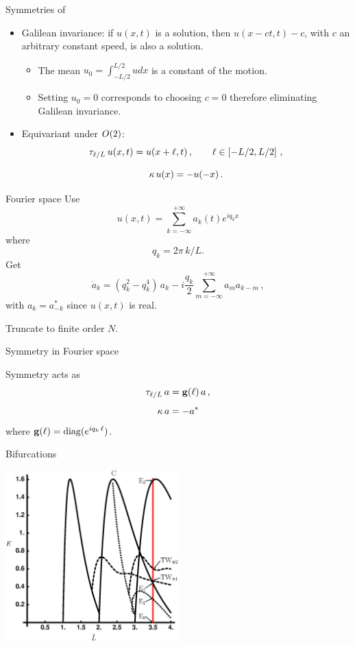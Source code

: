 \documentclass{beamer}
\begin{document}
\begin{frame}{Symmetries of \KSe}

\begin{itemize}
 \item Galilean invariance: if $u(x,t)$ is a solution, then $u(x-ct,t)-c$, with $c$ an arbitrary constant
	speed, is also a solution.
	\begin{itemize}
		\item The mean $u_0=\int_{-L/2}^{L/2} u dx$ is a constant of the motion. \\
		\item Setting $u_0=0$ corresponds to choosing $c=0$ therefore eliminating Galilean invariance.
	\end{itemize}
 \item Equivariant under $O(2)$:
\[
	\tau_{\ell/L}\, u(x,t) = u(x+\ell,t)\,,\qquad \ell\in\left[-L/2,L/2\right]\,,
\]

\[
    \kappa \, u(x) = -u(-x)
\,.
\]
\end{itemize}
\end{frame}

\begin{frame}{Fourier space}
Use
\[
  u(x,t)=\sum_{k=-\infty}^{+\infty} a_k (t) e^{ i q_k x }
\]
where
\[
 q_k = 2\pi\,k/L.
\]
Get
\[
 \dot{a}_k
     = ( q_k^2 - q_k^4 )\, a_k
    - i \frac{q_k}{2} \sum_{m=-\infty}^{+\infty} a_m a_{k-m}\,,
\]
with $a_{k}=a^\ast_{-k}$ since $u(x,t)$ is real.

Truncate to finite order $N$.
\end{frame}

\begin{frame}{Symmetry in Fourier space}

Symmetry acts as
\[
  \tau_{\ell/L}\, a = \mathbf{g}(\ell) \, a \,,
  \label{eq:shiftF}
\]
\[
   \kappa \, a = -a^\ast
\]
where $\mathbf{g}(\ell) = \mathrm{diag}( e^{i q_k\, \ell} )$.

\end{frame}

\begin{frame}{Bifurcations}
\begin{center}
  \includegraphics[width=0.5\textwidth]{../../figs/ksBifDiag}
\end{center}
\end{frame}
\end{document}
